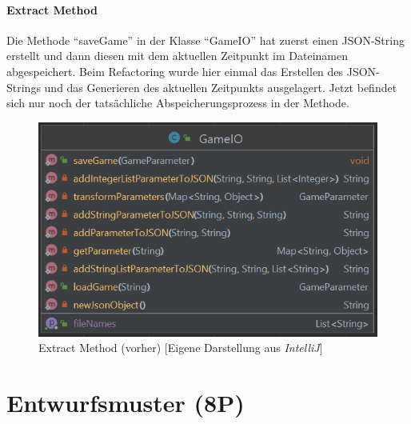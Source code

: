 \subsubsection{Extract Method}
\noindent Die Methode \enquote{saveGame} in der Klasse \enquote{GameIO} hat zuerst einen JSON-String erstellt und dann diesen mit dem aktuellen Zeitpunkt im Dateinamen abgespeichert. Beim Refactoring wurde hier einmal das Erstellen des JSON-Strings und das Generieren des aktuellen Zeitpunkts ausgelagert. Jetzt befindet sich nur noch der tatsächliche Abspeicherungsprozess in der Methode.

\begin{figure}[htbp]
\centering
\centerline{\includegraphics[scale=.5]{gameio1}}
\caption{Extract Method (vorher) [Eigene Darstellung aus \emph{IntelliJ}]}
\label{fig:gameio1}
\end{figure}

\newpage
\titlespacing*{\chapter}{0pt}{-30mm}{10pt}
  
\chapter{Entwurfsmuster (8P)}
\pagestyle{scrheadings}
\clearscrheadfoot
{}
\setcounter{page}{8}
\ofoot[\pagemark]{\pagemark}
\onehalfspacing

